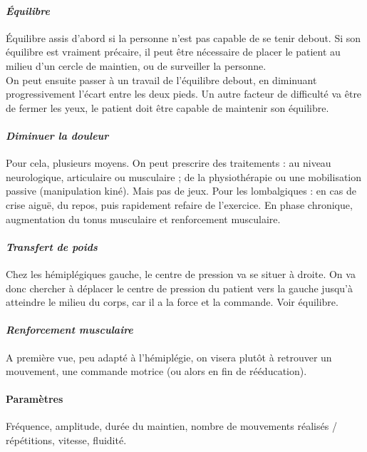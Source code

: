 	\paragraph{\emph{Équilibre} \\ }
Équilibre assis d’abord si la personne n’est pas capable de se tenir debout. Si son équilibre est vraiment précaire, il peut être nécessaire de placer le patient au milieu d’un cercle de maintien, ou de surveiller la personne.\\
On peut ensuite passer à un travail de l’équilibre debout, en diminuant progressivement l’écart entre les deux pieds. Un autre facteur de difficulté va être de fermer les yeux, le patient doit être capable de maintenir son équilibre.

	\paragraph{\emph{Diminuer la douleur} \\ }
Pour cela, plusieurs moyens. On peut prescrire des traitements : au niveau neurologique, articulaire ou musculaire ; de la physiothérapie ou une mobilisation passive (manipulation kiné). Mais pas de jeux.
Pour les lombalgiques : en cas de crise aiguë, du repos, puis rapidement refaire de l’exercice.
En phase chronique, augmentation du tonus musculaire et renforcement musculaire.

	\paragraph{\emph{Transfert de poids} \\ }
Chez les hémiplégiques gauche, le centre de pression va se situer à droite. On va donc chercher à déplacer le centre de pression du patient vers la gauche jusqu’à atteindre le milieu du corps, car il a la force et la commande. Voir équilibre.

	\paragraph{\emph{Renforcement musculaire} \\ }
A première vue, peu adapté à l’hémiplégie, on visera plutôt à retrouver un mouvement, une commande motrice (ou alors en fin de rééducation).

	\paragraph{Paramètres \\}
Fréquence, amplitude, durée du maintien, nombre de mouvements réalisés / répétitions, vitesse, fluidité.

